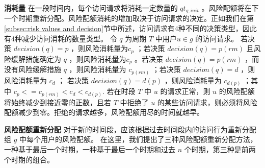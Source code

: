 \textbf{消耗量} 在一段时间内，每个访问请求将消耗一定数量的 $qt_{g,init}$ 。风险配额将在下一个时期重新分配。风险配额消耗的增加取决于访问请求的决定。正如我们在第 \ref{subsec:risk values and decision}节中所述，访问请求有4种不同的决策类型，因此有4种减少访问消耗的数量类型。 令 $q$ 为周期 $T$ 中用户$u \in g$ 的访问请求。 若决策 $decision(q)=p$ ，则风险消耗量为$c_p$ ；若决策 $decision(q)=p(rm)$ 且风险缓解措施确定为 $q$ ，则风险消耗量为$c_p$ 。若决策 $decision(q)=p(rm)$ ，而没有风险缓解措施 $q$ ，则风险消耗量为 $c_{p(rm)}$ ；若决策 $decision(q)=d$ ，则风险消耗量为 $c_d$ ； 若决策 $decision(q)=d(p)$ ，则风险消耗量为 $c_{d(p)}$ ；其中 $c_p <= c_{p(rm)} < c_d < c_{d(p)}$. 若在时段 $T$ 中 $u$ 的请求正常，则 $u$ 的风险配额将始终减少到接近零的正数，且若 $T$ 中拒绝了 $u$ 的某些访问请求，则必须将风险配额减少到零。拒绝的请求越多，风险配额用尽的时间就越早。

\textbf{风险配额重新分配} 对于新的时间段，应该根据过去时间段内的访问行为重新分配组 $g$ 中每个用户的风险配额。 在这里，我们提出了三种风险配额重新分配方法，一种基于最后一个时期，一种基于最后一个时期和过去 $n$ 个时期，第三种是前两个时期的组合。

